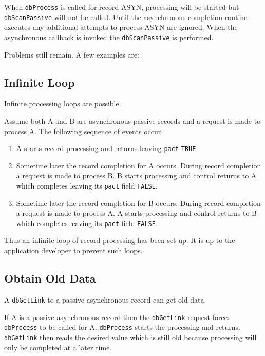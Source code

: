 When \verb|dbProcess| is called for record ASYN, processing will be started but \verb|dbScanPassive| will not be called. Until 
the asynchronous completion routine executes any additional attempts to process ASYN are ignored. When the 
asynchronous callback is invoked the \verb|dbScanPassive| is performed.

Problems still remain. A few examples are:

\subsection{Infinite Loop}

Infinite processing loops are possible.

Assume both A and B are asynchronous passive records and a request is made to process A. The following sequence of 
events occur.

\begin{enumerate}\item A starts record processing and returns leaving \verb|pact| \verb|TRUE|.

\item Sometime later the record completion for A occurs. During record completion a request is made to process B. B 
starts processing and control returns to A which completes leaving its \verb|pact| field \verb|FALSE|.

\item Sometime later the record completion for B occurs. During record completion a request is made to process A. A 
starts processing and control returns to B which completes leaving its \verb|pact| field \verb|FALSE|.

\end{enumerate}Thus an infinite loop of record processing has been set up. It is up to the application developer to prevent such loops.

\subsection{Obtain Old Data}

A \verb|dbGetLink| to a passive asynchronous record can get old data.

If A is a passive asynchronous record then the \verb|dbGetLink| request forces \verb|dbProcess| to be called for A. \verb|dbProcess| 
starts the processing and returns. \verb|dbGetLink| then reads the desired value which is still old because processing will only 
be completed at a later time.


